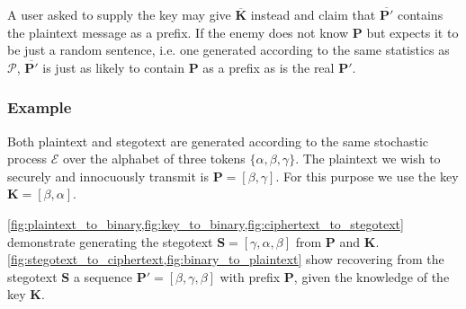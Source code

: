 \documentclass[draft]{IIBproject}
\makeatletter
\DeclareRobustCommand*{\ie}{i.e.\@\xspace}
\makeatother
\begin{document}
A user asked to supply the key may give $\mathbf {\overline K}$ instead and claim that $\mathbf {\overline {P'}}$ contains the plaintext message as a prefix. If the enemy does not know $\mathbf P$ but expects it to be just a random sentence, \ie one generated according to the same statistics as $\mathcal P$, $\mathbf {\overline {P'}}$ is just as likely to contain $\mathbf P$ as a prefix as is the real $\mathbf{P'}$.

\subsubsection{Example}

Both plaintext and stegotext are generated according to the same stochastic process $\mathcal E$ over the alphabet of three tokens $\{ \alpha, \beta, \gamma \}$. The plaintext we wish to securely and innocuously transmit is $\mathbf P = [\beta,\gamma]$. For this purpose we use the key $\mathbf K = [\beta,\alpha]$.

\cref{fig:plaintext_to_binary,fig:key_to_binary,fig:ciphertext_to_stegotext} demonstrate generating the stegotext $\mathbf S = [\gamma,\alpha,\beta]$ from $\mathbf P$ and $\mathbf K$. \cref{fig:stegotext_to_ciphertext,fig:binary_to_plaintext} show recovering from the stegotext $\mathbf S$ a sequence $\mathbf{P'} = [\beta,\gamma,\beta]$ with prefix $\mathbf P$, given the knowledge of the key $\mathbf K$.
\end{document}
